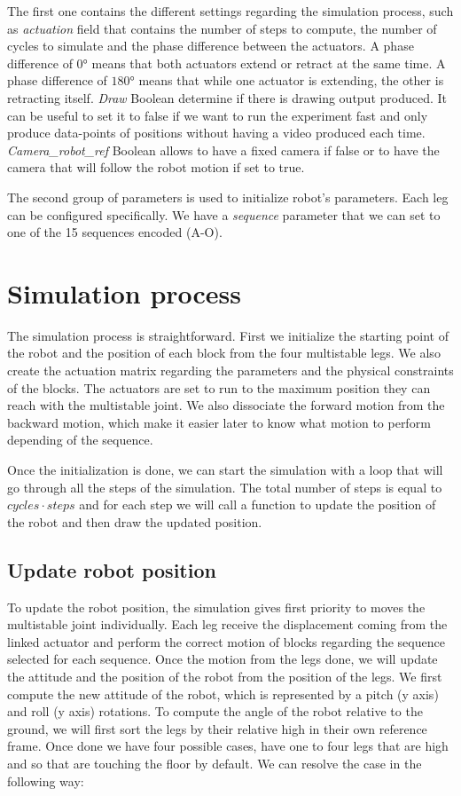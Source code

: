         The first one contains the different settings regarding the simulation process, such as \textit{actuation} field that contains the number of steps to compute, the number of cycles to simulate and the phase difference between the actuators. A phase difference of $0$° means that both actuators extend or retract at the same time. A phase difference of $180$° means that while one actuator is extending, the other is retracting itself. \textit{Draw} Boolean determine if there is drawing output produced. It can be useful to set it to false if we want to run the experiment fast and only produce data-points of positions without having a video produced each time. \textit{Camera\_robot\_ref} Boolean allows to have a fixed camera if false or to have the camera that will follow the robot motion if set to true.
        
        The second group of parameters is used to initialize robot's parameters. Each leg can be configured specifically. We have a \textit{sequence} parameter that we can set to one of the 15 sequences encoded (A-O). 
        
    \section{Simulation process}
        The simulation process is straightforward. First we initialize the starting point of the robot and the position of each block from the four multistable legs. We also create the actuation matrix regarding the parameters and the physical constraints of the blocks. The actuators are set to run to the maximum position they can reach with the multistable joint. We also dissociate the forward motion from the backward motion, which make it easier later to know what motion to perform depending of the sequence.
        
        Once the initialization is done, we can start the simulation with a loop that will go through all the steps of the simulation. The total number of steps is equal to $cycles \cdot steps$ and for each step we will call a function to update the position of the robot and then draw the updated position. 
        
        \subsection{Update robot position}
            To update the robot position, the simulation gives first priority to moves the multistable joint individually. Each leg receive the displacement coming from the linked actuator and perform the correct motion of blocks regarding the sequence selected for each sequence. Once the motion from the legs done, we will update the attitude and the position of the robot from the position of the legs.
            We first compute the new attitude of the robot, which is represented by a pitch (y axis) and roll (y axis) rotations. To compute the angle of the robot relative to the ground, we will first sort the legs by their relative high in their own reference frame. Once done we have four possible cases, have one to four legs that are high and so that are touching the floor by default. We can resolve the case in the following way:
